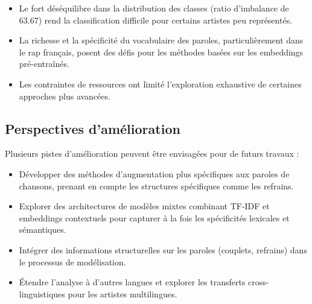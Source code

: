 \documentclass[a4paper,11pt]{article}
\begin{document}
\begin{itemize}
    \item Le fort déséquilibre dans la distribution des classes (ratio d'imbalance de 63.67) rend la classification difficile pour certains artistes peu représentés.
    \item La richesse et la spécificité du vocabulaire des paroles, particulièrement dans le rap français, posent des défis pour les méthodes basées sur les embeddings pré-entraînés.
    \item Les contraintes de ressources ont limité l'exploration exhaustive de certaines approches plus avancées.
\end{itemize}

\subsection{Perspectives d'amélioration}
Plusieurs pistes d'amélioration peuvent être envisagées pour de futurs travaux :

\begin{itemize}
    \item Développer des méthodes d'augmentation plus spécifiques aux paroles de chansons, prenant en compte les structures spécifiques comme les refrains.
    \item Explorer des architectures de modèles mixtes combinant TF-IDF et embeddings contextuels pour capturer à la fois les spécificités lexicales et sémantiques.
    \item Intégrer des informations structurelles sur les paroles (couplets, refrains) dans le processus de modélisation.
    \item Étendre l'analyse à d'autres langues et explorer les transferts cross-linguistiques pour les artistes multilingues.
\end{itemize}
\end{document}
